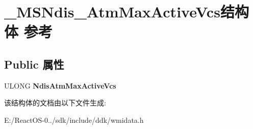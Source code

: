 \hypertarget{struct___m_s_ndis___atm_max_active_vcs}{}\section{\+\_\+\+M\+S\+Ndis\+\_\+\+Atm\+Max\+Active\+Vcs结构体 参考}
\label{struct___m_s_ndis___atm_max_active_vcs}
\subsection*{Public 属性}
\begin{DoxyCompactItemize}
\item 
\mbox{\label{struct___m_s_ndis___atm_max_active_vcs_abd5c27c8ef6ede7c0363fb979504b3ba}} 
U\+L\+O\+NG {\bfseries Ndis\+Atm\+Max\+Active\+Vcs}
\end{DoxyCompactItemize}


该结构体的文档由以下文件生成\+:\begin{DoxyCompactItemize}
\item 
E\+:/\+React\+O\+S-\/0../sdk/include/ddk/wmidata.\+h\end{DoxyCompactItemize}
